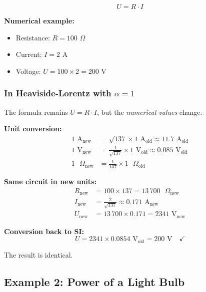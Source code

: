 	\begin{equation}
		U = R \cdot I
	\end{equation}
	
	\textbf{Numerical example:}
	\begin{itemize}
		\item Resistance: $R = 100$ $\Omega$
		\item Current: $I = 2$ A
		\item Voltage: $U = 100 \times 2 = 200$ V
	\end{itemize}
	
	\subsubsection{In Heaviside-Lorentz with $\alpha = 1$}
	
	The formula remains $U = R \cdot I$, but the \textit{numerical values} change.
	
	\textbf{Unit conversion:}
	\begin{align}
		1 \text{ A}_{\text{new}} &= \sqrt{137} \times 1 \text{ A}_{\text{old}} \approx 11.7 \text{ A}_{\text{old}} \\
		1 \text{ V}_{\text{new}} &= \frac{1}{\sqrt{137}} \times 1 \text{ V}_{\text{old}} \approx 0.085 \text{ V}_{\text{old}} \\
		1 \text{ }\Omega_{\text{new}} &= \frac{1}{137} \times 1 \text{ }\Omega_{\text{old}}
	\end{align}
	
	\textbf{Same circuit in new units:}
	\begin{align}
		R_{\text{new}} &= 100 \times 137 = 13\,700 \text{ }\Omega_{\text{new}} \\
		I_{\text{new}} &= \frac{2}{\sqrt{137}} \approx 0.171 \text{ A}_{\text{new}} \\
		U_{\text{new}} &= 13\,700 \times 0.171 = 2341 \text{ V}_{\text{new}}
	\end{align}
	
	\textbf{Conversion back to SI:}
	\begin{equation}
		U = 2341 \times 0.0854 \text{ V}_{\text{old}} = 200 \text{ V} \quad \checkmark
	\end{equation}
	
	The result is identical.
	
	\subsection{Example 2: Power of a Light Bulb}
	
